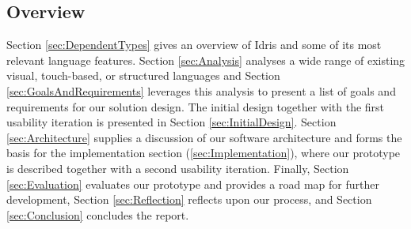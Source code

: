 \subsection{Overview}
Section \ref{sec:DependentTypes} gives an overview of Idris and some of its
most relevant language features. Section \ref{sec:Analysis} analyses a
wide range of existing visual, touch-based, or structured languages and Section
\ref{sec:GoalsAndRequirements} leverages this analysis to present a list of
goals and requirements for our solution design. The initial design together with the first usability
iteration is presented in Section \ref{sec:InitialDesign}. Section \ref{sec:Architecture}
supplies a discussion of our software architecture and forms the basis for the
implementation section (\ref{sec:Implementation}), where our prototype is
described together with a second usability iteration. Finally, Section \ref{sec:Evaluation}
evaluates our prototype and provides a road map for further development, Section \ref{sec:Reflection} reflects
upon our process, and Section \ref{sec:Conclusion} concludes the report.





